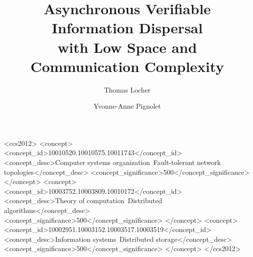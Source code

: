 \documentclass[sigconf,screen]{acmart}
\begin{document}
\title[AVID with Low Space and Communication Complexity]{ Asynchronous Verifiable Information Dispersal\texorpdfstring{\\}{}with
Low Space and Communication Complexity}

\author{Thomas Locher}

\author{Yvonne-Anne Pignolet}
\ifdefined\dfinitynote\authornote{\dfinitynote}\fi
{}

\begin{CCSXML}
<ccs2012>
   <concept>
       <concept_id>10010520.10010575.10011743</concept_id>
       <concept_desc>Computer systems organization~Fault-tolerant network topologies</concept_desc>
       <concept_significance>500</concept_significance>
       </concept>
   <concept>
       <concept_id>10003752.10003809.10010172</concept_id>
       <concept_desc>Theory of computation~Distributed algorithms</concept_desc>
       <concept_significance>500</concept_significance>
       </concept>
   <concept>
       <concept_id>10002951.10003152.10003517.10003519</concept_id>
       <concept_desc>Information systems~Distributed storage</concept_desc>
       <concept_significance>500</concept_significance>
       </concept>
 </ccs2012>
\end{CCSXML}



\end{document}
